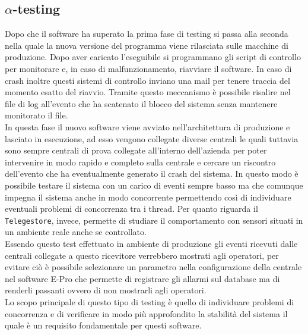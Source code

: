 \subsection{$\alpha$-testing}
Dopo che il software ha superato la prima fase di testing si passa alla seconda nella quale la nuova versione del programma viene rilasciata sulle macchine di produzione. Dopo aver caricato l'eseguibile si programmano gli script di controllo per monitorare e, in caso di malfunzionamento, riavviare il software. In caso di crash inoltre questi sistemi di controllo inviano una mail per tenere traccia del momento esatto del riavvio. Tramite questo meccanismo è possibile risalire nel file di log all'evento che ha scatenato il blocco del sistema senza mantenere monitorato il file.\\
In questa fase il nuovo software viene avviato nell'architettura di produzione e lasciato in esecuzione, ad esso vengono collegate diverse centrali le quali tuttavia sono sempre centrali di prova collegate all'interno dell'azienda per poter intervenire in modo rapido e completo sulla centrale e cercare un riscontro dell'evento che ha eventualmente generato il crash del sistema. In questo modo è possibile testare il sistema con un carico di eventi sempre basso ma che comunque impegna il sistema anche in modo concorrente permettendo così di individuare eventuali problemi di concorrenza tra i thread.
Per quanto riguarda il \texttt{Telegestore}, invece, permette di studiare il comportamento con sensori situati in un ambiente reale anche se controllato.\\
Essendo questo test effettuato in ambiente di produzione gli eventi ricevuti dalle centrali collegate a questo ricevitore verrebbero mostrati agli operatori, per evitare ciò è possibile selezionare un parametro nella configurazione della centrale nel software E-Pro che permette di registrare gli allarmi sul database ma di renderli passanti ovvero di non mostrarli agli operatori.\\
Lo scopo principale di questo tipo di testing è quello di individuare problemi di concorrenza e di verificare in modo più approfondito la stabilità del sistema il quale è un requisito fondamentale per questi software.
